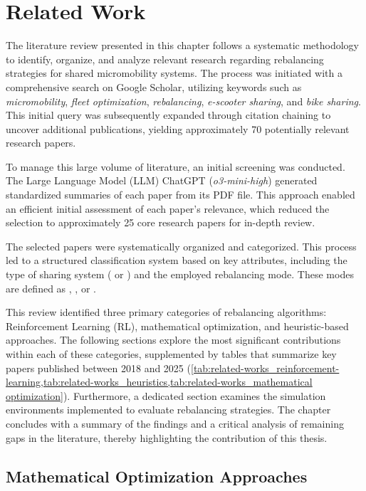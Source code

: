 \chapter{Related Work}\label{sec:related-work} %
The literature review presented in this chapter follows a systematic methodology to identify, organize, and analyze relevant research regarding rebalancing strategies for shared micromobility systems.
The process was initiated with a comprehensive search on Google Scholar, utilizing keywords such as \textit{micromobility}, \textit{fleet optimization}, \textit{rebalancing}, \textit{e-scooter sharing}, and \textit{bike sharing}.
This initial query was subsequently expanded through citation chaining to uncover additional publications, yielding approximately 70 potentially relevant research papers.

To manage this large volume of literature, an initial screening was conducted.
The Large Language Model (LLM) ChatGPT (\textit{o3-mini-high}) generated standardized summaries of each paper from its PDF file.
This approach enabled an efficient initial assessment of each paper's relevance, which reduced the selection to approximately 25 core research papers for in-depth review.

The selected papers were systematically organized and categorized.
This process led to a structured classification system based on key attributes, including the type of sharing system ( or ) and the employed rebalancing mode.
These modes are defined as , , or .

This review identified three primary categories of rebalancing algorithms: Reinforcement Learning (RL), mathematical optimization, and heuristic-based approaches.
The following sections explore the most significant contributions within each of these categories, supplemented by tables that summarize key papers published between 2018 and 2025 (\cref{tab:related-works_reinforcement-learning,tab:related-works_heuristics,tab:related-works_mathematical optimization}).
Furthermore, a dedicated section examines the simulation environments implemented to evaluate rebalancing strategies.
The chapter concludes with a summary of the findings and a critical analysis of remaining gaps in the literature, thereby highlighting the contribution of this thesis.
\\

\section{Mathematical Optimization Approaches}\label{sec:related-work_mathematical-optimization}

